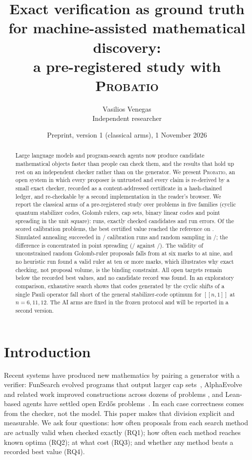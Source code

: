 \documentclass[11pt]{article}
\title{Exact verification as ground truth for machine-assisted mathematical discovery:\\
a pre-registered study with \textsc{Probatio}}
\author{Vasilios Venegas\\\small Independent researcher}
\date{Preprint, version 1 (classical arms), 1 November 2026}
\begin{document}
\maketitle

\begin{abstract}
Large language models and program-search agents now produce candidate mathematical
objects faster than people can check them, and the results that hold up rest on an
independent checker rather than on the generator. We present \textsc{Probatio}, an open
system in which every proposer is untrusted and every claim is re-derived by a small exact
checker, recorded as a content-addressed certificate in a hash-chained ledger, and
re-checkable by a second implementation in the reader's browser. We report the classical
arms of a pre-registered study over \NumProblems{} problems in five families (cyclic
quantum stabilizer codes, Golomb rulers, cap sets, binary linear codes and point spreading
in the unit square): \NumRuns{} runs, \NumCandidatesChecked{} exactly checked candidates and
\NumRunErrors{} run errors. Of the \NumCalibration{} scored calibration problems, the best
certified value reached the reference on \CalibReached{}. Simulated annealing succeeded in
\AnnealSuccess{}/\AnnealRuns{} calibration runs and random sampling in
\RandomSuccess{}/\RandomRuns{}; the difference is concentrated in point spreading
(\SpreadAnnealSuccess{}/\SpreadAnnealRuns{} against \SpreadRandomSuccess{}/\SpreadRandomRuns{}).
The validity of unconstrained random Golomb-ruler proposals falls from \GolombValidSix{} at
six marks to \GolombValidNine{} at nine, and no heuristic run found a valid ruler at ten or
more marks, which illustrates why exact checking, not proposal volume, is the binding
constraint. All \NumOpenTargets{} open targets remain below the recorded best values, and no
candidate record was found. In an exploratory comparison, exhaustive search shows that
codes generated by the cyclic shifts of a single Pauli operator fall short of the
general stabilizer-code optimum for $[[n,1]]$ at $n = 6, 11, 12$. The AI arms are fixed in
the frozen protocol and will be reported in a second version.
\end{abstract}

\section{Introduction}
Recent systems have produced new mathematics by pairing a generator with a verifier:
FunSearch evolved programs that output larger cap sets~\citep{funsearch2024},
AlphaEvolve and related work improved constructions across dozens of problems
\citep{alphaevolve2025,georgiev2025}, and Lean-based agents have settled open Erdős
problems~\citep{tsoukalas2026}. In each case correctness comes from the checker, not
the model. This paper makes that division explicit and measurable. We ask four
questions: how often proposals from each search method are actually valid when checked
exactly (RQ1); how often each method reaches known optima (RQ2); at what cost (RQ3);
and whether any method beats a recorded best value (RQ4).
\end{document}
